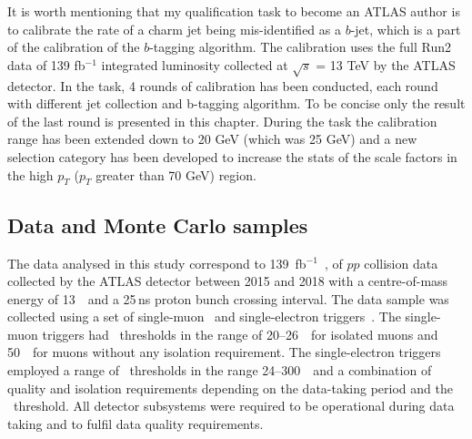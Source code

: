\documentclass[letterpaper,12pt]{article}
\begin{document}
It is worth mentioning that my qualification task to become an ATLAS author is to calibrate the rate of a charm jet being mis-identified as a $b$-jet, which is a part of the calibration of the $b$-tagging algorithm. The calibration uses the full Run2 data of 139 fb$^{-1}$ integrated luminosity collected at $\sqrt{s}$ = 13 TeV by the ATLAS detector. In the task, 4 rounds of calibration has been conducted, each round with different jet collection and b-tagging algorithm. To be concise only the result of the last round is presented in this chapter. During the task the calibration range has been extended down to 20 GeV (which was 25 GeV) and a new selection category has been developed to increase the stats of the scale factors in the high $p_T$ ($p_T$ greater than 70 GeV) region.

\subsection{Data and Monte Carlo samples}

\label{sec:samples}
The data analysed in this study correspond to 139~fb$^{-1}$~\cite{DAPR-2010-01,DAPR-2011-01,DAPR-2013-01,LUCID2}, of \(pp\)
collision data collected by the ATLAS detector between 2015 and 2018
with a centre-of-mass energy of 13~\TeV\ and a 25\,ns proton bunch
crossing interval. 
The data sample was collected using 
a set of single-muon~\cite{Aad:2020uyd} and single-electron 
triggers~\cite{TRIG-2018-05}.
The single-muon triggers had \pt\ thresholds in the range of 20--26~\GeV\ for 
isolated muons and 50~\GeV\ for muons without any isolation requirement. 
The single-electron triggers employed a range of \pt\ thresholds in the range 24--300~\GeV\ 
and a combination of quality and isolation requirements depending on the 
data-taking period and the \pt\ threshold.
 All detector subsystems were required to be operational
during data taking and to fulfil data quality requirements.  
\end{document}
